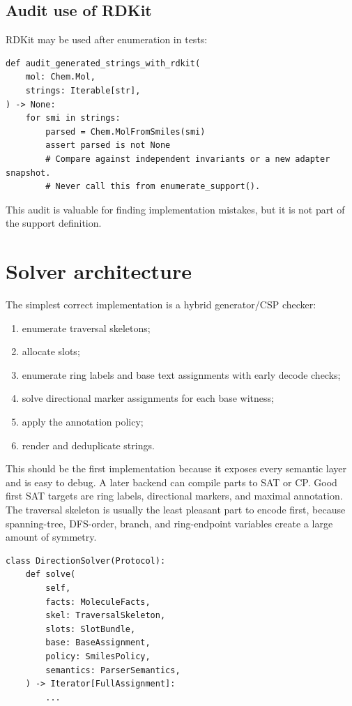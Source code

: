\documentclass[10pt,a4paper]{article}
\theoremstyle{definition}
\theoremstyle{remark}
\begin{document}
\subsection{Audit use of RDKit}

RDKit may be used after enumeration in tests:

\begin{lstlisting}
def audit_generated_strings_with_rdkit(
    mol: Chem.Mol,
    strings: Iterable[str],
) -> None:
    for smi in strings:
        parsed = Chem.MolFromSmiles(smi)
        assert parsed is not None
        # Compare against independent invariants or a new adapter snapshot.
        # Never call this from enumerate_support().
\end{lstlisting}

This audit is valuable for finding implementation mistakes, but it is not part
of the support definition.

\section{Solver architecture}
\label{s:solver}

The simplest correct implementation is a hybrid generator/CSP checker:
\begin{enumerate}[leftmargin=*]
\item enumerate traversal skeletons;
\item allocate slots;
\item enumerate ring labels and base text assignments with early decode checks;
\item solve directional marker assignments for each base witness;
\item apply the annotation policy;
\item render and deduplicate strings.
\end{enumerate}

This should be the first implementation because it exposes every semantic layer
and is easy to debug.  A later backend can compile parts to SAT or CP.  Good
first SAT targets are ring labels, directional markers, and maximal annotation.
The traversal skeleton is usually the least pleasant part to encode first,
because spanning-tree, DFS-order, branch, and ring-endpoint variables create a
large amount of symmetry.

\begin{lstlisting}
class DirectionSolver(Protocol):
    def solve(
        self,
        facts: MoleculeFacts,
        skel: TraversalSkeleton,
        slots: SlotBundle,
        base: BaseAssignment,
        policy: SmilesPolicy,
        semantics: ParserSemantics,
    ) -> Iterator[FullAssignment]:
        ...
\end{lstlisting}
\end{document}
